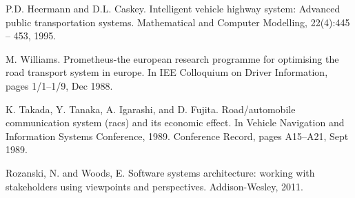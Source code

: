 \documentclass[conference]{IEEEtran}
\begin{document}
\begin{thebibliography}{00}
     P.D. Heermann and D.L. Caskey. Intelligent vehicle highway system: Advanced public transportation
    systems. Mathematical and Computer Modelling, 22(4):445 – 453, 1995.
    
     M. Williams. Prometheus-the european research programme for optimising the road transport
    system in europe. In IEE Colloquium on Driver Information, pages 1/1–1/9, Dec 1988.
    
     K. Takada, Y. Tanaka, A. Igarashi, and D. Fujita. Road/automobile communication system
    (racs) and its economic effect. In Vehicle Navigation and Information Systems Conference,
    1989. Conference Record, pages A15–A21, Sept 1989.
    
     Rozanski, N. and Woods, E. Software systems architecture: working with stakeholders using viewpoints and perspectives. Addison-Wesley, 2011.
\end{thebibliography}
\end{document}
